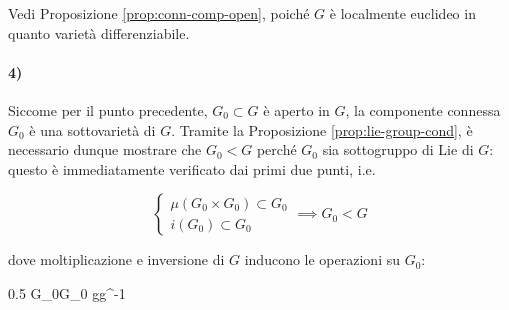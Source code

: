 {Vedi Proposizione \ref{prop:conn-comp-open}, poiché $ G $ è localmente euclideo in quanto varietà differenziabile.

\paragraph{4)}

Siccome per il punto precedente, $ G_{0} \subset G $ è aperto in $ G $, la componente connessa $ G_{0} $ è una sottovarietà di $ G $. Tramite la Proposizione \ref{prop:lie-group-cond}, è necessario dunque mostrare che $ G_{0} < G $ perché $ G_{0} $ sia sottogruppo di Lie di $ G $: questo è immediatamente verificato dai primi due punti, i.e.

\begin{equation}
	\begin{cases}
		\mu(G_{0} \times G_{0}) \subset G_{0} \\
		i(G_{0}) \subset G_{0}
	\end{cases} %
	\implies %
	G_{0} < G
\end{equation}

dove moltiplicazione e inversione di $ G $ inducono le operazioni su $ G_{0} $:

	{0.5}{%
				{G_{0}}{G_{0}}
				{g}{g^{-1}}
			}
}


